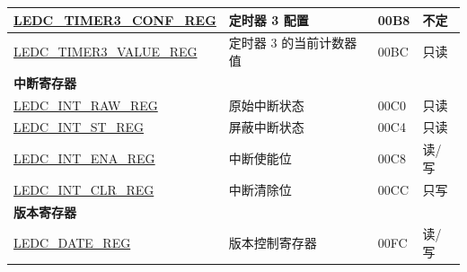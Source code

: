 \begin{longtable}{ | p{6cm} | p{7.2cm} | p{1.3cm} | p{1cm} | }
\hyperref[regdesc:LEDCTIMERXCONFREG]{LEDC\_TIMER3\_CONF\_REG} & 定时器 3 配置 & \hexprefix{}00B8 & 不定 \\ \hline
\hyperref[regdesc:LEDCTIMERXVALUEREG]{LEDC\_TIMER3\_VALUE\_REG} & 定时器 3 的当前计数器值 & \hexprefix{}00BC & 只读 \\ \hline
\multicolumn{4}{|l|}{\textbf{中断寄存器}} \\ \hline
\hyperref[regdesc:LEDCINTRAWREG]{LEDC\_INT\_RAW\_REG} & 原始中断状态 & \hexprefix{}00C0 & 只读 \\ \hline
\hyperref[regdesc:LEDCINTSTREG]{LEDC\_INT\_ST\_REG} & 屏蔽中断状态 & \hexprefix{}00C4 & 只读 \\ \hline
\hyperref[regdesc:LEDCINTENAREG]{LEDC\_INT\_ENA\_REG} & 中断使能位 & \hexprefix{}00C8 & 读/写 \\ \hline
\hyperref[regdesc:LEDCINTCLRREG]{LEDC\_INT\_CLR\_REG} & 中断清除位 & \hexprefix{}00CC & 只写 \\ \hline
\multicolumn{4}{|l|}{\textbf{版本寄存器}} \\ \hline
\hyperref[regdesc:LEDCDATEREG]{LEDC\_DATE\_REG} & 版本控制寄存器 & \hexprefix{}00FC & 读/写 \\ \hline
\end{longtable}
